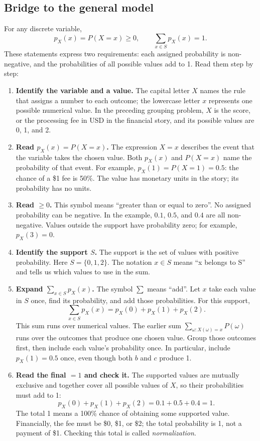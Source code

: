 \subsection{Bridge to the general model}
For any discrete variable,
\[p_X(x)=P(X=x)\geq0,\qquad \sum_{x\in S}p_X(x)=1.\]
These statements express two requirements: each assigned probability is non-negative, and the probabilities of all possible values add to 1. Read them step by step:
\begin{enumerate}
\item \textbf{Identify the variable and a value.} The capital letter $X$ names the rule that assigns a number to each outcome; the lowercase letter $x$ represents one possible numerical value. In the preceding grouping problem, $X$ is the score, or the processing fee in USD in the financial story, and its possible values are 0, 1, and 2.
\item \textbf{Read $p_X(x)=P(X=x)$.} The expression $X=x$ describes the event that the variable takes the chosen value. Both $p_X(x)$ and $P(X=x)$ name the probability of that event. For example, $p_X(1)=P(X=1)=0.5$: the chance of a \$1 fee is 50\%. The value has monetary units in the story; its probability has no units.
\item \textbf{Read $\geq0$.} This symbol means ``greater than or equal to zero''. No assigned probability can be negative. In the example, $0.1$, $0.5$, and $0.4$ are all non-negative. Values outside the support have probability zero; for example, $p_X(3)=0$.
\item \textbf{Identify the support $S$.} The support is the set of values with positive probability. Here $S=\{0,1,2\}$. The notation $x\in S$ means ``x belongs to S'' and tells us which values to use in the sum.
\item \textbf{Expand $\sum_{x\in S}p_X(x)$.} The symbol $\sum$ means ``add''. Let $x$ take each value in $S$ once, find its probability, and add those probabilities. For this support,
\[
\sum_{x\in S}p_X(x)=p_X(0)+p_X(1)+p_X(2).
\]
This sum runs over numerical values. The earlier sum $\sum_{\omega:X(\omega)=x}P(\omega)$ runs over the outcomes that produce one chosen value. Group those outcomes first, then include each value's probability once. In particular, include $p_X(1)=0.5$ once, even though both $b$ and $c$ produce 1.
\item \textbf{Read the final $=1$ and check it.} The supported values are mutually exclusive and together cover all possible values of $X$, so their probabilities must add to 1:
\[
p_X(0)+p_X(1)+p_X(2)=0.1+0.5+0.4=1.
\]
The total 1 means a 100\% chance of obtaining some supported value. Financially, the fee must be \$0, \$1, or \$2; the total probability is 1, not a payment of \$1. Checking this total is called \emph{normalization}.
\end{enumerate}

